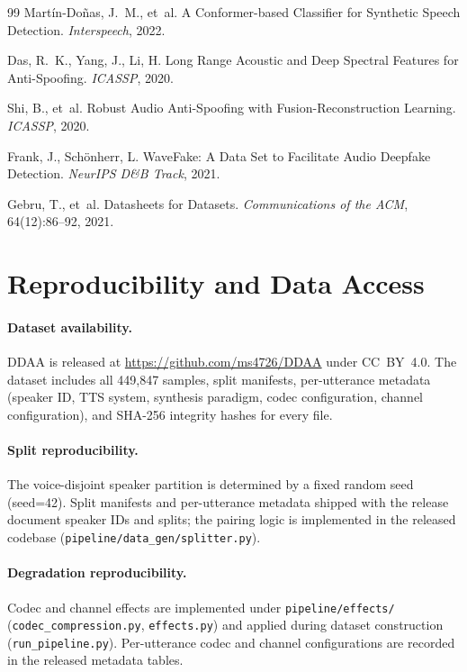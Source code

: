 \documentclass{article}
\newcommand{\ddaa}{\textsc{DDAA}}
\begin{document}
\begin{thebibliography}{99}
Mart{\'i}n-Do{\~n}as, J.~M., et~al.
\newblock A Conformer-based Classifier for Synthetic Speech Detection.
\newblock \textit{Interspeech}, 2022.

Das, R.~K., Yang, J., Li, H.
\newblock Long Range Acoustic and Deep Spectral Features for Anti-Spoofing.
\newblock \textit{ICASSP}, 2020.

Shi, B., et~al.
\newblock Robust Audio Anti-Spoofing with Fusion-Reconstruction Learning.
\newblock \textit{ICASSP}, 2020.

Frank, J., Sch{\"o}nherr, L.
\newblock WaveFake: A Data Set to Facilitate Audio Deepfake Detection.
\newblock \textit{NeurIPS D\&B Track}, 2021.

Gebru, T., et~al.
\newblock Datasheets for Datasets.
\newblock \textit{Communications of the ACM}, 64(12):86--92, 2021.

\end{thebibliography}

\appendix

\section{Reproducibility and Data Access}
\label{sec:repro}

\paragraph{Dataset availability.}
\ddaa{} is released at \url{https://github.com/ms4726/DDAA} under
CC~BY~4.0.  The dataset includes all 449,847 samples, split manifests,
per-utterance metadata (speaker ID, TTS system, synthesis paradigm, codec
configuration, channel configuration), and SHA-256 integrity hashes for
every file.

\paragraph{Split reproducibility.}
The voice-disjoint speaker partition is determined by a fixed random seed
(seed=42).  Split manifests and per-utterance metadata shipped with the release
document speaker IDs and splits; the pairing logic is implemented in the
released codebase (\texttt{pipeline/data\_gen/splitter.py}).

\paragraph{Degradation reproducibility.}
Codec and channel effects are implemented under \texttt{pipeline/effects/}
(\texttt{codec\_compression.py}, \texttt{effects.py}) and applied during
dataset construction (\texttt{run\_pipeline.py}).  Per-utterance codec and
channel configurations are recorded in the released metadata tables.
\end{document}
